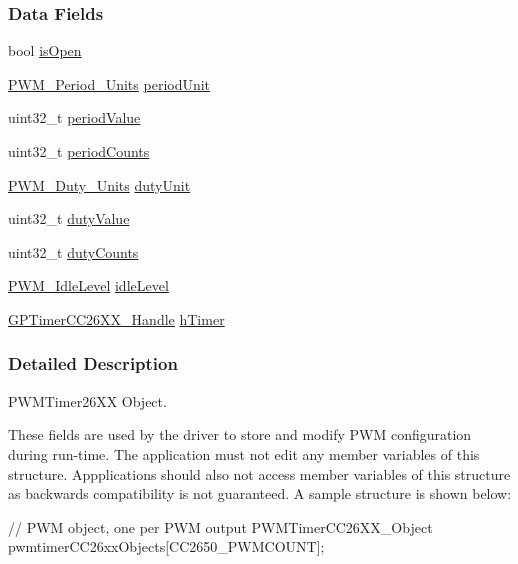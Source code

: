 \subsubsection*{Data Fields}
\begin{DoxyCompactItemize}
\item 
bool \hyperlink{struct_p_w_m_timer_c_c26_x_x___object_a441df1ad70adabb3de769358d301416c}{is\+Open}
\item 
\hyperlink{_p_w_m_8h_a11aa442e82549992c98729216d64fd63}{P\+W\+M\+\_\+\+Period\+\_\+\+Units} \hyperlink{struct_p_w_m_timer_c_c26_x_x___object_aa844c8a863f84a9775dbabb0241b41fd}{period\+Unit}
\item 
uint32\+\_\+t \hyperlink{struct_p_w_m_timer_c_c26_x_x___object_ad725c417ec82ce43ae3d37d7c6fbb204}{period\+Value}
\item 
uint32\+\_\+t \hyperlink{struct_p_w_m_timer_c_c26_x_x___object_ae502cdc25152927e72670c6d89d26fa9}{period\+Counts}
\item 
\hyperlink{_p_w_m_8h_abc7bc5565f2767cf9f06c1572044a8ee}{P\+W\+M\+\_\+\+Duty\+\_\+\+Units} \hyperlink{struct_p_w_m_timer_c_c26_x_x___object_aa1dc95a5203db4aa57210b66d75827fe}{duty\+Unit}
\item 
uint32\+\_\+t \hyperlink{struct_p_w_m_timer_c_c26_x_x___object_ab32ceff831d4f1c28fea0dcd51694c60}{duty\+Value}
\item 
uint32\+\_\+t \hyperlink{struct_p_w_m_timer_c_c26_x_x___object_a212dc0c3c4ae31c8bc285add11ee31a8}{duty\+Counts}
\item 
\hyperlink{_p_w_m_8h_a5a40c7014745d15b0c1a604dae5593f9}{P\+W\+M\+\_\+\+Idle\+Level} \hyperlink{struct_p_w_m_timer_c_c26_x_x___object_ad185ce1a42838b87b520ba3ca066ccc1}{idle\+Level}
\item 
\hyperlink{_g_p_timer_c_c26_x_x_8h_ab85403dde5940c587c57ca1a140e655a}{G\+P\+Timer\+C\+C26\+X\+X\+\_\+\+Handle} \hyperlink{struct_p_w_m_timer_c_c26_x_x___object_a8ccd272d60d7cae93d6ab39d50b3a175}{h\+Timer}
\end{DoxyCompactItemize}


\subsubsection{Detailed Description}
P\+W\+M\+Timer26\+X\+X Object. 

These fields are used by the driver to store and modify P\+W\+M configuration during run-\/time. The application must not edit any member variables of this structure. Appplications should also not access member variables of this structure as backwards compatibility is not guaranteed. A sample structure is shown below\+: 
\begin{DoxyCode}
\textcolor{comment}{// PWM object, one per PWM output}
PWMTimerCC26XX_Object pwmtimerCC26xxObjects[CC2650\_PWMCOUNT];
\end{DoxyCode}
 

